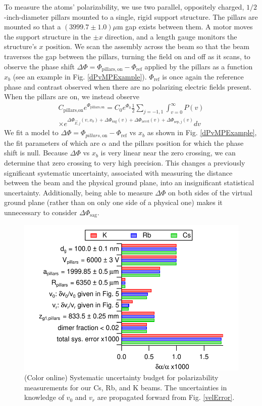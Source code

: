 \documentclass[twocolumn,prl,showpacs,superscriptaddress]{revtex4-1}   %
\newcommand{\figref}[1]{Fig. \ref{#1}}
\newcommand{\dphisepj}{\Delta\Phi_{\mathrm{sep},j}}
\newcommand{\dphisag}{\Delta\Phi_{\mathrm{sag}}}
\newcommand{\dphiaccel}{\Delta\Phi_{\mathrm{accel}}}
\begin{document}
To measure the atoms' polarizability, we use two parallel, oppositely charged, $1/2$-inch-diameter pillars mounted to a single, rigid support structure. The pillars are mounted so that a $(3999.7 \pm 1.0)\mu$m gap exists between them. A motor moves the support structure in the $\pm x$ direction, and a length gauge monitors the structure's $x$ position. We scan the assembly across the beam so that the beam traverses the gap between the pillars, turning the field on and off as it scans, to observe the phase shift $\Delta\Phi = \Phi_{\mathrm{pillars,on}} - \Phi_{\mathrm{ref}}$ applied by the pillars as a function $x_b$ (see an example in \figref{dPvMPExample}). $\Phi_{\mathrm{ref}}$ is once again the reference phase and contrast observed when there are no polarizing electric fields present.
When the pillars are on, we instead observe
\begin{align}
	C_{\textrm{pillars,on}}e^{\Phi_{\textrm{pillars,on}}} = 
		C_0e^{\Phi_0}		
		\frac{1}{2} \sum_{j=-1,1}
		\int_{v=0}^{\infty} P(v) \nonumber \\ \times
		e^{
			\Delta\Phi_{\vec{E},j}(v,x_b) + 
			\dphisag(v) + \dphiaccel(v) + \dphisepj(v)
		} 
		dv
	\label{CPPolesEOn}
\end{align}
We fit a model to $\Delta\Phi = \Phi_{pillars,\mathrm{on}} - \Phi_{\mathrm{ref}}$ vs $x_b$ as shown in \figref{dPvMPExample}, the fit parameters of which are $\alpha$ and the pillars position for which the phase shift is null. Because $\Delta\Phi$ vs $x_b$ is very linear near the zero crossing, we can determine that zero crossing to very high precision. 
This changes a previously significant systematic uncertainty, associated with measuring the distance between the beam and the physical ground plane, into an insignificant statistical uncertainty.
Additionally, being able to measure $\Delta\Phi$ on both sides of the virtual ground plane (rather than on only one side of a physical one) makes it unnecessary to consider $\dphisag$. 

\begin{figure}
\includegraphics[width=\linewidth,keepaspectratio]{displayPolErrors.pdf}
\caption{\label{polError}(Color online) Systematic uncertainty budget for polarizability measurements for our Cs, Rb, and K beams.
The uncertainties in knowledge of $v_0$ and $v_r$ are propagated forward from \figref{velError}.}
\end{figure}
\end{document}
